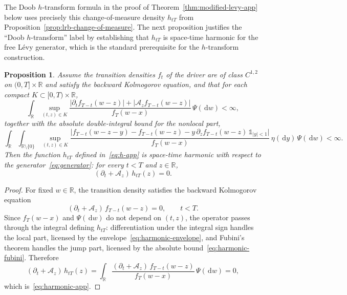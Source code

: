 \documentclass{article}
\newtheorem{prop}[thm]{Proposition}
\newcommand{\levy}{{L\'evy }}
\def\1{\mathds{1}}
\def\R{\mathbb{R}}
\def\d{\,\mathrm{d}}
\theoremstyle{definition}
\begin{document}
The Doob $h$-transform formula in the proof of Theorem~\ref{thm:modified-levy-app} below uses precisely this change-of-measure density $h_{tT}$ from Proposition~\ref{prop:lrb-change-of-measure}. The next proposition justifies the ``Doob $h$-transform'' label by establishing that $h_{tT}$ is space-time harmonic for the free \levy generator, which is the standard prerequisite for the $h$-transform construction.

\begin{prop}
\label{prop:harmonic-app}
Assume the transition densities $f_t$ of the driver are of class $C^{1,2}$ on $(0,T] \times \R$ and satisfy the backward Kolmogorov equation, and that for each compact $K \subset [0,T) \times \R$,
\begin{equation}\label{eq:harmonic-envelope}
  \int_{\R} \sup_{(t,z) \in K} \frac{\bigl|\partial_t f_{T-t}(w - z)\bigr| + \bigl|\mathcal{A}_z f_{T-t}(w - z)\bigr|}{f_T(w - x)}\,\Psi(\d w) < \infty,
\end{equation}
together with the absolute double-integral bound for the nonlocal part,
\begin{equation}\label{eq:harmonic-fubini}
  \int_{\R} \int_{\R\setminus\{0\}} \sup_{(t,z) \in K} \frac{\bigl|f_{T-t}(w - z - y) - f_{T-t}(w - z) - y\,\partial_z f_{T-t}(w - z)\,\1_{|y|<1}\bigr|}{f_T(w - x)}\,\eta(\d y)\,\Psi(\d w) < \infty.
\end{equation}
Then the function $h_{tT}$ defined in~\eqref{eq:h-app} is space-time harmonic with respect to the generator~\eqref{eq:generator}: for every $t < T$ and $z \in \R$,
\begin{equation}\label{eq:harmonic-app}
  (\partial_t + \mathcal{A}_z)\,h_{tT}(z) = 0.
\end{equation}
\end{prop}

\begin{proof}
For fixed $w \in \R$, the transition density satisfies the backward Kolmogorov equation
\begin{equation*}
  (\partial_t + \mathcal{A}_z)\,f_{T-t}(w - z) = 0, \qquad t < T.
\end{equation*}
Since $f_T(w - x)$ and $\Psi(\d w)$ do not depend on $(t, z)$, the operator passes through the integral defining $h_{tT}$: differentiation under the integral sign handles the local part, licensed by the envelope~\eqref{eq:harmonic-envelope}, and Fubini's theorem handles the jump part, licensed by the absolute bound~\eqref{eq:harmonic-fubini}. Therefore
\begin{equation*}
  (\partial_t + \mathcal{A}_z)\,h_{tT}(z)
  = \int_{\R} \frac{(\partial_t + \mathcal{A}_z)\,f_{T-t}(w - z)}{f_T(w - x)}\,\Psi(\d w)
  = 0,
\end{equation*}
which is~\eqref{eq:harmonic-app}.
\end{proof}
\end{document}
